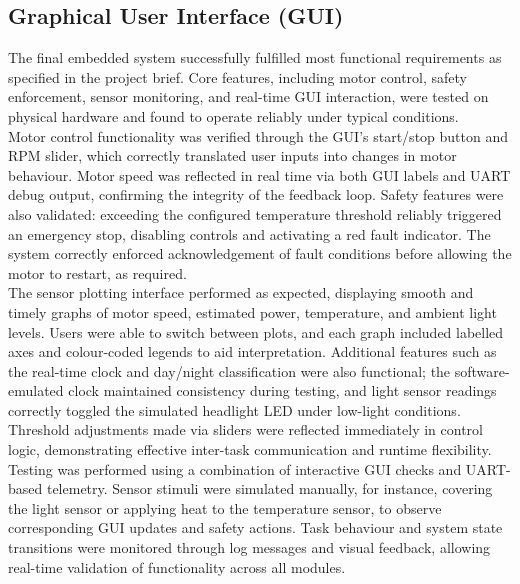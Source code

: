 \documentclass[a4paper, 11pt, titlepage]{article}
\begin{document}
\newpage
\subsection{Graphical User Interface (GUI)}
The final embedded system successfully fulfilled most functional requirements as specified in the project brief. Core features, including motor control, safety enforcement, sensor monitoring, and real-time GUI interaction, were tested on physical hardware and found to operate reliably under typical conditions.\\

Motor control functionality was verified through the GUI’s start/stop button and RPM slider, which correctly translated user inputs into changes in motor behaviour. Motor speed was reflected in real time via both GUI labels and UART debug output, confirming the integrity of the feedback loop. Safety features were also validated: exceeding the configured temperature threshold reliably triggered an emergency stop, disabling controls and activating a red fault indicator. The system correctly enforced acknowledgement of fault conditions before allowing the motor to restart, as required.\\

The sensor plotting interface performed as expected, displaying smooth and timely graphs of motor speed, estimated power, temperature, and ambient light levels. Users were able to switch between plots, and each graph included labelled axes and colour-coded legends to aid interpretation. Additional features such as the real-time clock and day/night classification were also functional; the software-emulated clock maintained consistency during testing, and light sensor readings correctly toggled the simulated headlight LED under low-light conditions. Threshold adjustments made via sliders were reflected immediately in control logic, demonstrating effective inter-task communication and runtime flexibility.\\

Testing was performed using a combination of interactive GUI checks and UART-based telemetry. Sensor stimuli were simulated manually, for instance, covering the light sensor or applying heat to the temperature sensor, to observe corresponding GUI updates and safety actions. Task behaviour and system state transitions were monitored through log messages and visual feedback, allowing real-time validation of functionality across all modules.\\
\end{document}
